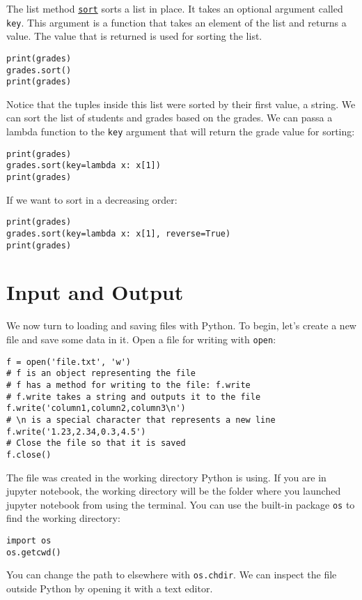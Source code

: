 \documentclass[12pt, a4paper]{article}
\begin{document}
The list method \href{https://docs.python.org/3.6/library/stdtypes.html?highlight=list.sort\#list.sort}{\texttt{sort}} sorts a list in place.
It takes an optional argument called \texttt{key}.
This argument is a function that takes an element of the list and returns a value.
The value that is returned is used for sorting the list.
\lstset{language=jupyter-python,label= ,caption= ,captionpos=b,numbers=none}
\begin{lstlisting}
print(grades)
grades.sort()
print(grades)
\end{lstlisting}

Notice that the tuples inside this list were sorted by their first value, a string.
We can sort the list of students and grades based on the grades.
We can passa a lambda function to the \texttt{key} argument that will return the grade value for sorting:
\lstset{language=jupyter-python,label= ,caption= ,captionpos=b,numbers=none}
\begin{lstlisting}
print(grades)
grades.sort(key=lambda x: x[1])
print(grades)
\end{lstlisting}

If we want to sort in a decreasing order:
\lstset{language=jupyter-python,label= ,caption= ,captionpos=b,numbers=none}
\begin{lstlisting}
print(grades)
grades.sort(key=lambda x: x[1], reverse=True)
print(grades)
\end{lstlisting}
\section{Input and Output}
\label{sec:org59662e2}
We now turn to loading and saving files with Python.
To begin, let's create a new file and save some data in it.
Open a file for writing with \texttt{open}:
\lstset{language=jupyter-python,label= ,caption= ,captionpos=b,numbers=none}
\begin{lstlisting}
f = open('file.txt', 'w')
# f is an object representing the file
# f has a method for writing to the file: f.write
# f.write takes a string and outputs it to the file
f.write('column1,column2,column3\n')
# \n is a special character that represents a new line
f.write('1.23,2.34,0.3,4.5')
# Close the file so that it is saved
f.close()
\end{lstlisting}
The file was created in the working directory Python is using.
If you are in jupyter notebook, the working directory will be the folder where you launched jupyter notebook from using the terminal.
You can use the built-in package \texttt{os} to find the working directory:
\lstset{language=jupyter-python,label= ,caption= ,captionpos=b,numbers=none}
\begin{lstlisting}
import os
os.getcwd()
\end{lstlisting}
You can change the path to elsewhere with \texttt{os.chdir}.
We can inspect the file outside Python by opening it with a text editor.
\end{document}
